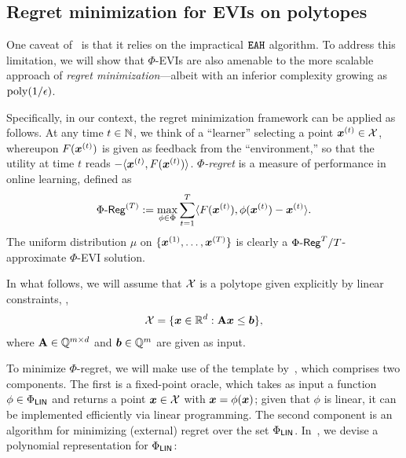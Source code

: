 \subsection{Regret minimization for EVIs on polytopes}

One caveat of~ is that it relies on the impractical $\mathtt{EAH}$ algorithm. To address this limitation, we will show that $\Phi$-EVIs are also amenable to the more scalable approach of \emph{regret minimization}---albeit with an inferior complexity growing as $\mathrm{poly}(1/\epsilon)$.

Specifically, in our context, the regret minimization framework can be applied as follows. At any time $t \in \mathbb N$, we think of a ``learner'' selecting a point ${\bm{x}}^{(t)} \in {\mathcal{X}}$, whereupon $F({\bm{x}}^{(t)})$ is given as feedback from the ``environment,'' so that the utility at time $t$ reads $- \langle {\bm{x}}^{(t)}, F({\bm{x}}^{(t)}) \rangle$. \emph{$\Phi$-regret} is a measure of performance in online learning, defined as
%
\begin{equation*}
    \Phi\text{-}\mathsf{Reg}^{(T)} := \max_{\phi \in \Phi} \sum_{t=1}^T \langle F({\bm{x}}^{(t)}), \phi({\bm{x}}^{(t)}) - {\bm{x}}^{(t)} \rangle.
\end{equation*}
The uniform distribution $\mu$ on $\{ {\bm{x}}^{(1)}, \dots, {\bm{x}}^{(T)} \}$ is clearly a $\Phi\text{-}\mathsf{Reg}^T/T$-approximate $\Phi$-EVI solution. 

In what follows, we will assume that ${\mathcal{X}}$ is a polytope given explicitly by linear constraints, \ie, \begin{align*}
    {\mathcal{X}} = \{ {\bm{x}} \in \mathbb R^d : {\mathbf{A}} {\bm{x}} \le {\bm{b}} \},
\end{align*}
where ${\mathbf{A}} \in \mathbb Q^{m \times d}$ and ${\bm{b}} \in \mathbb Q^m$ are given as input.

To minimize $\Phi$-regret, we will make use of the template by~\citet{Gordon08:No}, which comprises two components. The first is a fixed-point oracle, which takes as input a function $\phi \in \Phi_\mathsf{LIN}$ and returns a point 
${\bm{x}} \in {\mathcal{X}}$ with
${\bm{x}} = \phi({\bm{x}})$; given that $\phi$ is linear, it can be implemented efficiently via linear programming. The second component is an algorithm for minimizing (external) regret over the set $\Phi_\mathsf{LIN}$. In~, we devise a polynomial representation for $\Phi_\mathsf{LIN}$:

